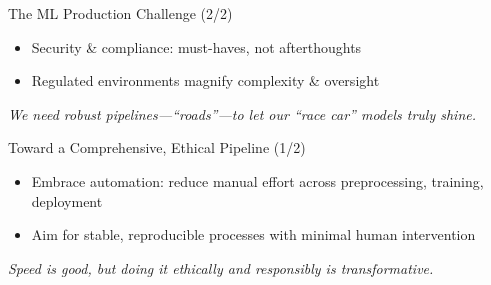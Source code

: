\documentclass[aspectratio=169]{beamer}
\begin{document}
%
%
\begin{frame}{The ML Production Challenge (2/2)}
\begin{itemize}
\item Security \& compliance: must-haves, not afterthoughts
\item Regulated environments magnify complexity \& oversight
\end{itemize}

\vspace{0.8em}
\emph{We need robust pipelines—``roads''—to let our ``race car'' models truly shine.}
\end{frame}

%
%
\begin{frame}{Toward a Comprehensive, Ethical Pipeline (1/2)}
\begin{itemize}
\item Embrace automation: reduce manual effort across preprocessing, training, deployment
\item Aim for stable, reproducible processes with minimal human intervention
\end{itemize}

\vspace{0.8em}
\emph{Speed is good, but doing it ethically and responsibly is transformative.}
\end{frame}
\end{document}
